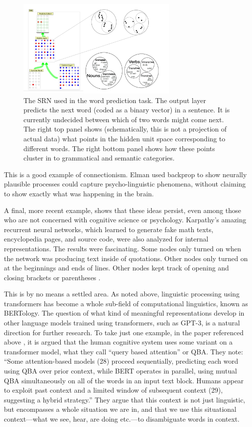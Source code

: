 \begin{figure}[h]
\centering
\includegraphics[width=0.7\textwidth]{images/elmanCategories.png}
\caption[Pamela Payne.]{The SRN used in the word prediction task. The output layer predicts the next word (coded as a binary vector) in a sentence. It is currently undecided between which of two words might come next. The right top panel shows (schematically, this is not a projection of actual data) what points in the hidden unit space corresponding to different words. The right bottom panel shows how these points cluster in to grammatical and semantic categories.}
\label{srn_words}
\end{figure}

This is a good example of connectionism. Elman used backprop to show neurally plausible processes could capture psycho-linguistic phenomena, without claiming to show exactly what was happening in the brain.

A final, more recent example, shows that these ideas persist, even among those who are not concerned with cognitive science or psychology. Karpathy's amazing recurrent neural networks, which learned to generate fake math texts, encyclopedia pages, and source code, were also analyzed for internal representations. The results were fascinating. Some nodes only turned on when the network was producing text inside of quotations. Other nodes only turned on at the beginnings and ends of lines. Other nodes kept track of opening and closing brackets or parentheses \cite{karpathy2015visualizing}. 

This is by no means a settled area.  As noted above, linguistic processing using transformers has become a whole sub-field of computational linguistics, known as BERTology. The question of what kind of meaningful representations develop in other language models trained using transformers, such as GPT-3, is a natural direction for further research. To take just one example, in the paper referenced above  \cite{mcclelland2020placing}, it is argued that the human cognitive system uses some variant on a transformer model, what they call ``query based attention'' or QBA. They note: ``Some attention-based models (28) proceed sequentially, predicting each word using QBA over prior context, while BERT operates in parallel, using mutual QBA simultaneously on all of the words in an input text block. Humans appear to exploit past context and a limited window of subsequent context (29), suggesting a hybrid strategy.'' They argue that this context is not just linguistic, but encompasses a whole situation we are in, and that we use this situational context---what we see, hear, are doing etc.---to disambiguate words in context. 
